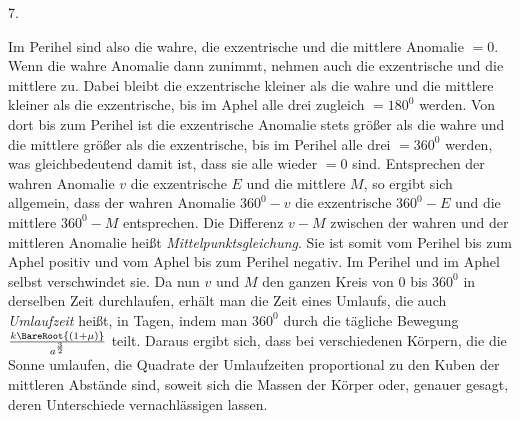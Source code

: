 \par{}
\begin{center}
7.
\end{center}
Im Perihel sind also die wahre, die exzentrische und die mittlere Anomalie $= 0$.
Wenn die wahre Anomalie dann zunimmt, nehmen auch die exzentrische und die mittlere zu.
Dabei bleibt die exzentrische kleiner als die wahre und die mittlere kleiner als die
exzentrische, bis im Aphel alle drei zugleich $= 180^0$ werden. Von dort bis zum Perihel
ist die exzentrische Anomalie stets größer als die wahre und die mittlere größer als
die exzentrische, bis im Perihel alle drei $= 360^0$ werden, was gleichbedeutend damit
ist, dass sie alle wieder $= 0$ sind. Entsprechen der wahren Anomalie $v$ die exzentrische $E$ und die mittlere $M$, so
ergibt sich allgemein, dass der wahren Anomalie $360^0-v$ die exzentrische
$360^0-E$ und die mittlere $360^0-M$ entsprechen.
Die Differenz $v-M$ zwischen der wahren und der mittleren Anomalie heißt
\emph{Mittelpunktsgleichung}. Sie ist somit vom Perihel bis zum Aphel positiv und
vom Aphel bis zum Perihel negativ. Im Perihel und im Aphel selbst verschwindet sie.
Da nun $v$ und $M$ den ganzen Kreis von $0$ bis $360^0$ in derselben Zeit durchlaufen,
erhält man die Zeit eines Umlaufs, die auch \emph{Umlaufzeit} heißt, in Tagen, indem
man $360^0$ durch die tägliche Bewegung $\frac{k\BareRoot{(1+\mu)}}{a^{\frac{3}{2}}}$
teilt. Daraus ergibt sich, dass bei verschiedenen Körpern, die die Sonne umlaufen,
die Quadrate der Umlaufzeiten proportional zu den Kuben der mittleren Abstände sind,
soweit sich die Massen der Körper oder, genauer gesagt, deren Unterschiede
vernachlässigen lassen.
